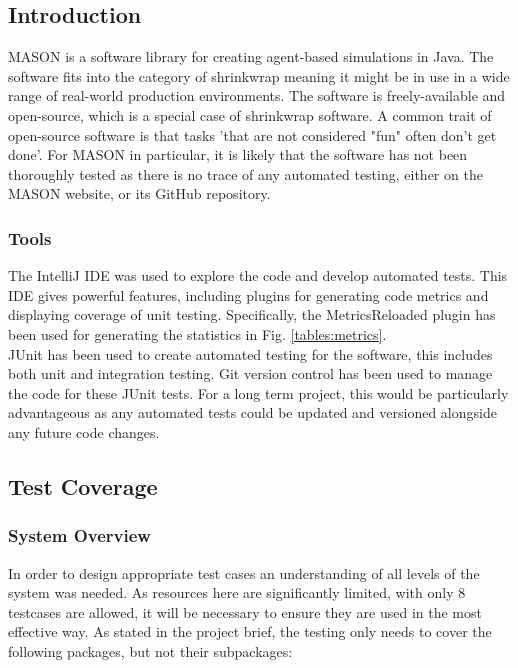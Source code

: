 \documentclass[11pt]{article}
\begin{document}
\subsection{Introduction}
MASON is a software library for creating agent-based simulations in Java. 
The software fits into the category of shrinkwrap meaning it might be in use in a wide range of real-world production environments. The software is freely-available and open-source, which is a special case of shrinkwrap software. A common trait of open-source software is that tasks 'that are not considered "fun" often don't get done'.\cite{five_worlds}
For MASON in particular, it is likely that the software has not been thoroughly tested as there is no trace of any automated testing, either on the MASON website, or its GitHub repository.


\subsubsection{Tools}
The IntelliJ IDE was used to explore the code and develop automated tests. This IDE gives powerful features, including plugins for generating code metrics and displaying coverage of unit testing.
Specifically, the MetricsReloaded plugin\cite{metrics_reloaded} has been used for generating the statistics in Fig. \ref{tables:metrics}.
\\

JUnit has been used to create automated testing for the software, this includes both unit and integration testing.
Git version control has been used to manage the code for these JUnit tests.
For a long term project, this would be particularly advantageous as any automated tests could be updated and versioned alongside any future code changes.

\subsection{Test Coverage}
\subsubsection{System Overview}
In order to design appropriate test cases an understanding of all levels of the system was needed. As resources here are significantly limited, with only 8 testcases are allowed, it will be necessary to ensure they are used in the most effective way.
As stated in the project brief, the testing only needs to cover the following packages, but not their subpackages:
\end{document}
